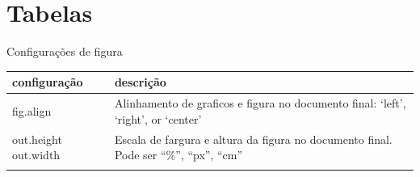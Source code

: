 \documentclass[
	12pt,				%
	oneside,			%
	a4paper,			%
	english,			%
	french,				%
	spanish,			%
	brazil				%
	]{abntex2}
\def\toprule{\hlineB{3}} %
\def\midrule{\hline}
\def\bottomrule{\hlineB{3}} %
\begin{document}
\hypertarget{tabelas}{%
\section{Tabelas}\label{tabelas}}

Configurações de figura

\begin{longtable}[]{@{}ll@{}}
\toprule
\begin{minipage}[b]{0.47\columnwidth}\raggedright
configuração\strut
\end{minipage} & \begin{minipage}[b]{0.47\columnwidth}\raggedright
descrição\strut
\end{minipage}\tabularnewline
\midrule
\endhead
\begin{minipage}[t]{0.47\columnwidth}\raggedright
fig.align\strut
\end{minipage} & \begin{minipage}[t]{0.47\columnwidth}\raggedright
Alinhamento de graficos e figura no documento final: `left', `right', or
`center'\strut
\end{minipage}\tabularnewline
\begin{minipage}[t]{0.47\columnwidth}\raggedright
out.height out.width\strut
\end{minipage} & \begin{minipage}[t]{0.47\columnwidth}\raggedright
Escala de fargura e altura da figura no documento final. Pode ser
``\%'', ``px'', ``cm''\strut
\end{minipage}\tabularnewline
\bottomrule
\end{longtable}

\postextual

\postextual



\end{document}
